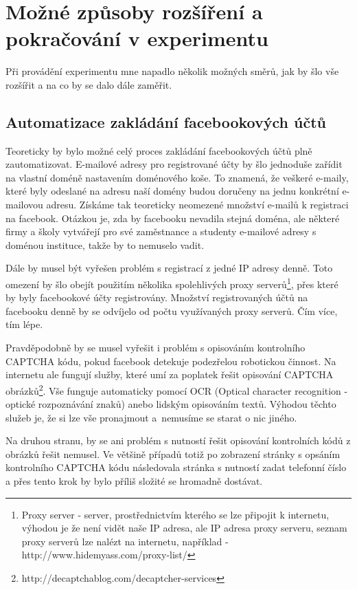 \documentclass[thesis=M,czech]{FITthesis}[2013/05/10]
\begin{document}
\section{Možné způsoby rozšíření a pokračování v experimentu}

Při provádění experimentu mne napadlo několik možných směrů, jak by šlo vše rozšířit a na co by se dalo dále zaměřit.

\subsection{Automatizace zakládání facebookových účtů}

Teoreticky by bylo možné celý proces zakládání facebookových účtů plně zautomatizovat. E-mailové adresy pro registrované účty by šlo jednoduše zařídit na vlastní doméně nastavením doménového koše. To znamená, že veškeré e-maily, které byly odeslané na adresu naší domény budou doručeny na jednu konkrétní e-mailovou adresu. Získáme tak teoreticky neomezené množství e-mailů k registraci na facebook. Otázkou je, zda by facebooku nevadila stejná doména, ale některé firmy a školy vytvářejí pro své zaměstnance a studenty e-mailové adresy s doménou instituce, takže by to nemuselo vadit.

Dále by musel být vyřešen problém s registrací z jedné IP adresy denně. Toto omezení by šlo obejít použitím několika spolehlivých proxy serverů\footnote{Proxy server - server, prostřednictvím kterého se lze připojit k internetu, výhodou je že není vidět naše IP adresa, ale IP adresa proxy serveru, seznam proxy serverů lze nalézt na internetu, například - http://www.hidemyass.com/proxy-list/}, přes které by byly facebookové účty registrovány. Množství registrovaných účtů na facebooku denně by se odvíjelo od počtu využívaných proxy serverů. Čím více, tím lépe.

Pravděpodobně by se musel vyřešit i problém s opisováním kontrolního CAPTCHA kódu, pokud facebook detekuje podezřelou robotickou činnost. Na internetu ale fungují služby, které umí za poplatek řešit opisování CAPTCHA obrázků\footnote{http://decaptchablog.com/decaptcher-services}. Vše funguje automaticky pomocí OCR (Optical character recognition - optické rozpoznávání znaků) anebo lidským opisováním textů. Výhodou těchto služeb je, že si lze vše pronajmout a~nemusíme se starat o nic jiného. 

Na druhou stranu, by se ani problém s nutností řešit opisování kontrolních kódů z obrázků řešit nemusel. Ve většině případů totiž po zobrazení stránky s opsáním kontrolního CAPTCHA kódu následovala stránka s nutností zadat telefonní číslo a přes tento krok by bylo příliš složité se hromadně dostávat.
\end{document}
